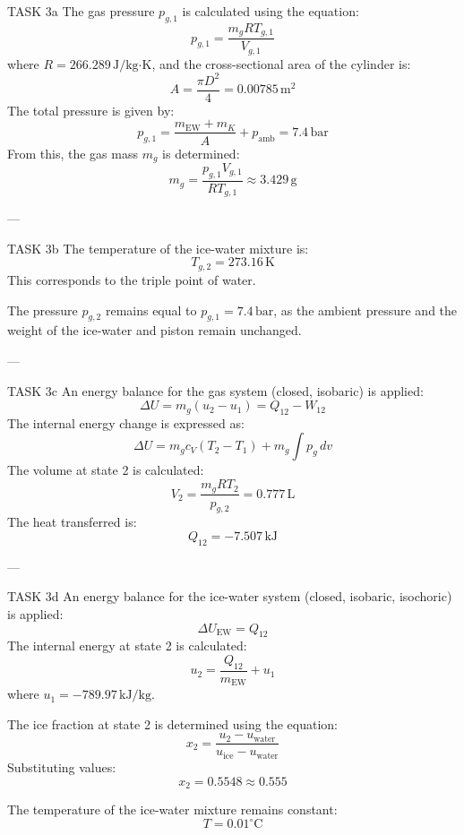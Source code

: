 TASK 3a  
The gas pressure \( p_{g,1} \) is calculated using the equation:  
\[
p_{g,1} = \frac{m_g R T_{g,1}}{V_{g,1}}
\]  
where \( R = 266.289 \, \text{J/kg·K} \), and the cross-sectional area of the cylinder is:  
\[
A = \frac{\pi D^2}{4} = 0.00785 \, \text{m}^2
\]  
The total pressure is given by:  
\[
p_{g,1} = \frac{m_{\text{EW}} + m_K}{A} + p_{\text{amb}} = 7.4 \, \text{bar}
\]  
From this, the gas mass \( m_g \) is determined:  
\[
m_g = \frac{p_{g,1} V_{g,1}}{R T_{g,1}} \approx 3.429 \, \text{g}
\]  

---

TASK 3b  
The temperature of the ice-water mixture is:  
\[
T_{g,2} = 273.16 \, \text{K}
\]  
This corresponds to the triple point of water.  

The pressure \( p_{g,2} \) remains equal to \( p_{g,1} = 7.4 \, \text{bar} \), as the ambient pressure and the weight of the ice-water and piston remain unchanged.  

---

TASK 3c  
An energy balance for the gas system (closed, isobaric) is applied:  
\[
\Delta U = m_g (u_2 - u_1) = Q_{12} - W_{12}
\]  
The internal energy change is expressed as:  
\[
\Delta U = m_g c_V (T_2 - T_1) + m_g \int p_g \, dv
\]  
The volume at state 2 is calculated:  
\[
V_2 = \frac{m_g R T_2}{p_{g,2}} = 0.777 \, \text{L}
\]  
The heat transferred is:  
\[
Q_{12} = -7.507 \, \text{kJ}
\]  

---

TASK 3d  
An energy balance for the ice-water system (closed, isobaric, isochoric) is applied:  
\[
\Delta U_{\text{EW}} = Q_{12}
\]  
The internal energy at state 2 is calculated:  
\[
u_2 = \frac{Q_{12}}{m_{\text{EW}}} + u_1
\]  
where \( u_1 = -789.97 \, \text{kJ/kg} \).  

The ice fraction at state 2 is determined using the equation:  
\[
x_2 = \frac{u_2 - u_{\text{water}}}{u_{\text{ice}} - u_{\text{water}}}
\]  
Substituting values:  
\[
x_2 = 0.5548 \approx 0.555
\]  

The temperature of the ice-water mixture remains constant:  
\[
T = 0.01^\circ\text{C}
\]
